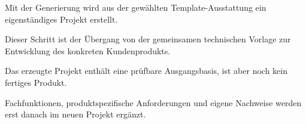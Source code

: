 \begin{beginnerstatement}

Mit der Generierung wird aus der gewählten Template-Ausstattung ein
eigenständiges Projekt erstellt.

Dieser Schritt ist der Übergang von der gemeinsamen technischen Vorlage zur
Entwicklung des konkreten Kundenprodukts.

Das erzeugte Projekt enthält eine prüfbare Ausgangsbasis, ist aber noch kein
fertiges Produkt.

Fachfunktionen, produktspezifische Anforderungen und eigene Nachweise werden
erst danach im neuen Projekt ergänzt.

\end{beginnerstatement}
